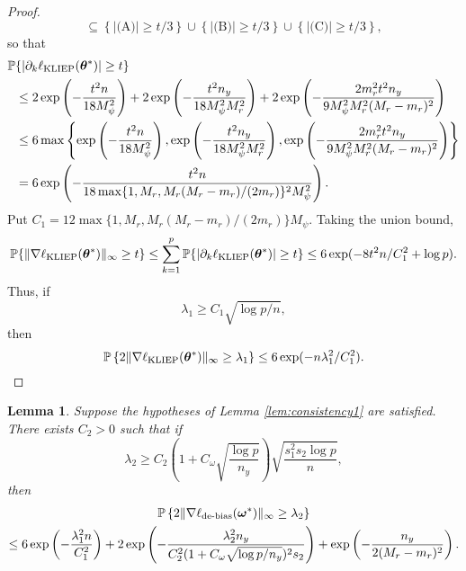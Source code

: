 \documentclass[11pt]{article}
\numberwithin{equation}{section}
\numberwithin{theorem}{section}
\def\fattheta{\boldsymbol{\theta}}
\def\fatomega{\boldsymbol{\omega}}
\newtheorem{lem}{Lemma}[section]
\theoremstyle{definition}
\theoremstyle{remark}
\begin{document}
\begin{proof}
\begin{equation}
\subseteq\left\{ |\text{(A)}| \geq t/3 \right\}\cup\left\{ |\text{(B)}| \geq t/3 \right\}\cup\left\{ |\text{(C)}| \geq t/3 \right\},
\end{equation}
so that
\begin{equation}
\begin{aligned}
\PP & \{ |\partial_k \ell_\text{KLIEP}(\fattheta^*)| \geq t \} \\
&\leq 2\exp\left( -\frac{t^2 n}{18 M_\psi ^2} \right) + 2\exp\left( -\frac{t^2 n_y}{18 M_\psi^2 M_r^2} \right) + 2\exp\left( -\frac{2 m_r^2 t^2 n_y}{9 M_\psi^2 M_r^2 (M_r - m_r)^2} \right) \\
&\leq 6 \max\left\{ \exp\left( -\frac{t^2 n}{18 M_\psi ^2} \right), \exp\left( -\frac{t^2 n_y}{18 M_\psi^2 M_r^2} \right), \exp\left( -\frac{2 m_r^2 t^2 n_y}{9 M_\psi^2 M_r^2 (M_r - m_r)^2} \right) \right\} \\
&= 6\exp\left( -\frac{t^2 n}{18 \max\{1, M_r, M_r (M_r - m_r) / (2 m_r)\}^2 M_\psi^2} \right).
\end{aligned}
\end{equation}
Put $C_1 = 12 \max\{1, M_r, M_r (M_r - m_r) / (2 m_r)\} M_\psi$.
Taking the union bound,
\begin{equation}
\PP\{ \|\nabla \ell_\text{KLIEP}(\fattheta^*)\|_\infty \geq t \}
\leq \sum_{k=1}^p \PP\{ |\partial_k \ell_\text{KLIEP}(\fattheta^*)| \geq t \}
\leq 6\exp(-8 t^2 n / C_1^2 + \log p).
\end{equation}
Thus, if
\begin{equation}
\lambda_1 \geq C_1 \sqrt{\log p / n},
\end{equation}
then
\begin{equation}
\PP\left\{ 2 \|\nabla \ell_\text{KLIEP}(\fattheta^*)\|_\infty \geq\lambda_1 \right\}
\leq 6\exp(-n \lambda_1^2 / C_1^2).
\end{equation}
\end{proof}

\begin{lem} \label{lem:grad2}
Suppose the hypotheses of Lemma \ref{lem:consistency1} are satisfied.
There exists $C_2 > 0$ such that if
\begin{equation} \label{eq:lambda2}
\lambda_2
\geq C_2 \left( 1+C_\omega \sqrt{\frac{\log p}{n_y}} \right) \sqrt{\frac{s_1^2 s_2 \log p}{n}},
\end{equation}
then
\begin{multline}
\PP\left\{ 2 \|\nabla \ell_\text{de-bias}(\fatomega^*)\|_\infty \geq \lambda_2 \right\} \\
\leq 6\exp\left( -\frac{\lambda_1^2 n}{C_1^2} \right) + 2\exp\left( -\frac{\lambda_2^2 n_y}{C_2^2 (1+C_\omega \sqrt{\log p / n_y})^2 s_2}\right) + \exp\left( -\frac{n_y}{2(M_r - m_r)^2} \right).
\end{multline}
\end{lem}
\end{document}
